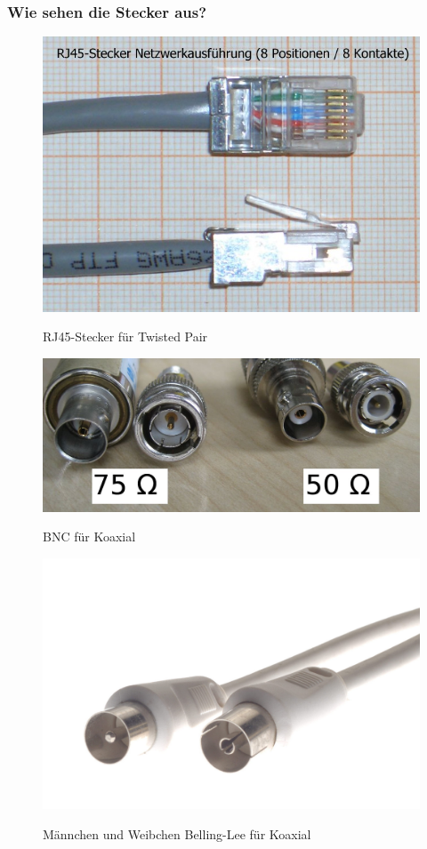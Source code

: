 \subsubsection*{Wie sehen die Stecker aus?}
\begin{figure}[H]
    \begin{center}
    \label{pic:RJ45}
    \includegraphics[width=.5\textwidth]{images/RJ45-Stecker-Netzwerk.jpg}
    \caption{RJ45-Stecker für Twisted Pair\cite{wiki}}
    \end{center}
\end{figure}

\begin{figure}[H]
    \begin{center}
    \label{pic:BNC}
    \includegraphics[width=.5\textwidth]{images/BNC.png}
    \caption{BNC für Koaxial\cite{wiki}}
    \end{center}
\end{figure}

\begin{figure}[H]
    \begin{center}
    \label{pic:BellingLee}
    \includegraphics[width=.5\textwidth]{images/belling_lee_male_and_female_connector.jpg}
    \caption{Männchen und Weibchen Belling-Lee für Koaxial\cite{wiki}}
    \end{center}
\end{figure}

